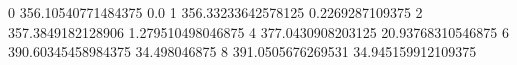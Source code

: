 0 356.10540771484375 0.0
1 356.33233642578125 0.2269287109375
2 357.3849182128906 1.279510498046875
4 377.0430908203125 20.93768310546875
6 390.60345458984375 34.498046875
8 391.0505676269531 34.945159912109375
